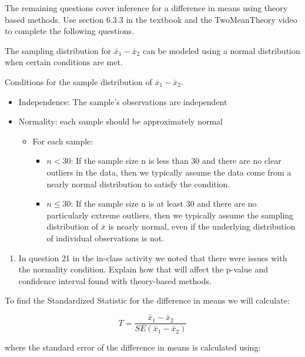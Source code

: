 \documentclass[
]{report}
\providecommand{\tightlist}{%
  \setlength{\itemsep}{0pt}\setlength{\parskip}{0pt}}
\begin{document}
The remaining questions cover inference for a difference in means using theory based methods. Use section 6.3.3 in the textbook and the TwoMeanTheory video to complete the following questions.

The sampling distribution for \(\bar{x}_1-\bar{x}_2\) can be modeled using a normal distribution when certain conditions are met.

Conditions for the sample distribution of \(\bar{x}_1-\bar{x}_2\).

\begin{itemize}
\item
  Independence: The sample's observations are independent
\item
  Normality: each sample should be approximately normal

  \begin{itemize}
  \item
    For each sample:

    \begin{itemize}
    \item
      \(n < 30\): If the sample size n is less than 30 and there are no clear outliers in the data, then we typically assume the data come from a nearly normal distribution to satisfy the condition.
    \item
      \(n \le 30\): If the sample size n is at least 30 and there are no particularly extreme outliers, then we typically assume the sampling distribution of \(\bar{x}\) is nearly normal, even if the underlying distribution of individual observations is not.
    \end{itemize}
  \end{itemize}
\end{itemize}

\begin{enumerate}
\def\labelenumi{\arabic{enumi}.}
\tightlist
\item
  In question 21 in the in-class activity we noted that there were issues with the normality condition. Explain how that will affect the p-value and confidence interval found with theory-based methods.
\end{enumerate}

\vspace{1in}

To find the Standardized Statistic for the difference in means we will calculate:

\[T = \frac{\bar{x}_1-\bar{x}_2}{SE(\bar{x}_1-\bar{x}_2)}\]

where the standard error of the difference in means is calculated using:
\end{document}
